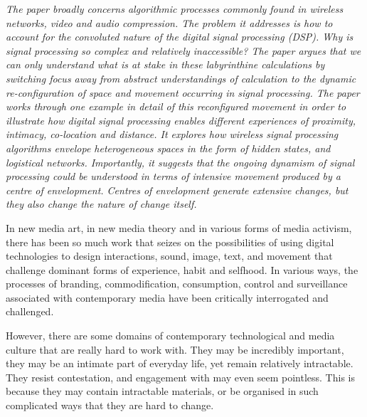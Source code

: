 




{\em The paper broadly concerns algorithmic processes commonly found in
wireless networks, video and audio compression. The problem it
addresses is how to account for the convoluted nature of the digital
signal processing (DSP). Why is signal processing so complex and
relatively inaccessible? The paper argues that we can only understand
what is at stake in these labyrinthine calculations by switching focus
away from abstract understandings of calculation to the dynamic
re{}-configuration of space and movement occurring in signal
processing. The paper works through one example in detail of this
reconfigured movement in order to illustrate how digital signal
processing enables different experiences of proximity, intimacy,
co{}-location and distance. It explores how wireless signal processing
algorithms envelope heterogeneous spaces in the form of hidden states,
and logistical networks. Importantly, it suggests that the ongoing
dynamism of signal processing could be understood in terms of intensive
movement produced by a centre of envelopment. Centres of envelopment
generate extensive changes, but they also change the nature of change
itself.}


In new media art, in new media theory and in various forms of media
activism, there has been so much work that seizes on the possibilities
of using digital technologies to design interactions, sound, image,
text, and movement that challenge dominant forms of experience, habit
and selfhood. In various ways, the processes of branding,
commodification, consumption, control and surveillance associated with
contemporary media have been critically interrogated and challenged. 

However, there are some domains of contemporary technological and media
culture that are really hard to work with. They may be incredibly
important, they may be an intimate part of everyday life, yet remain
relatively intractable. They resist contestation, and engagement with
may even seem pointless. This is because they may contain intractable
materials, or be organised in such complicated ways that they are hard
to change. 

